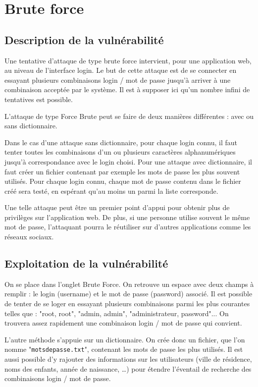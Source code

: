 \newpage

\section{Brute force}

\subsection{Description de la vulnérabilité}

Une tentative d'attaque de type brute force intervient, pour une application web, au niveau de l'interface login. Le but de cette attaque est de se connecter en essayant plusieurs combinaisons login / mot de passe jusqu'à arriver à une combinaison acceptée par le système. Il est à supposer ici qu'un nombre infini de tentatives est possible.

L'attaque de type Force Brute peut se faire de deux manières différentes : avec ou sans dictionnaire. 

Dans le cas d'une attaque sans dictionnaire, pour chaque login connu, il faut tenter toutes les combinaisons d'un ou plusieurs caractères alphanumériques jusqu'à correspondance avec le login choisi.
Pour une attaque avec dictionnaire, il faut créer un fichier contenant par exemple les mots de passe les plus souvent utilisés. Pour chaque login connu, chaque mot de passe contenu dans le fichier créé sera testé, en espérant qu'au moins un parmi la liste corresponde.

Une telle attaque peut être un premier point d'appui pour obtenir plus de privilèges sur l'application web. De plus, si une personne utilise souvent le même mot de passe, l'attaquant pourra le réutiliser sur d'autres applications comme les réseaux sociaux.


\subsection{Exploitation de la vulnérabilité}

On se place dans l'onglet Brute Force. On retrouve un espace avec deux champs à remplir : le login (username) et le mot de passe (password) associé. Il est possible de tenter de se loger en essayant plusieurs combinaisons parmi les plus courantes telles que : "root, root", "admin, admin", "administrateur, password"... On trouvera assez rapidement une combinaison login / mot de passe qui convient.

L'autre méthode s'appuie sur un dictionnaire. On crée donc un fichier, que l'on nomme "\texttt{motsdepasse.txt}", contenant les mots de passe les plus utilisés. Il est aussi possible d'y rajouter des informations sur les utilisateurs (ville de résidence, noms des enfants, année de naissance, …) pour étendre l'éventail de recherche des combinaisons login / mot de passe.

